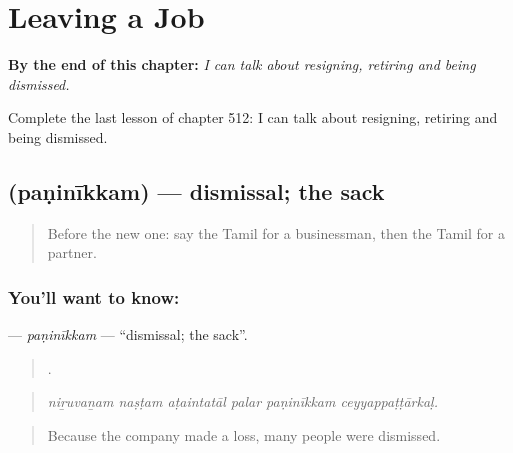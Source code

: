 
\chapter{Leaving a Job}
\label{ch:ta-leaving-a-job}

\begin{chapteropening}
\textbf{By the end of this chapter:} \emph{I can talk about resigning, retiring and being dismissed.}

Complete the last lesson of chapter 512: I can talk about resigning, retiring and being dismissed.
\end{chapteropening}

\section[\texorpdfstring{\ta{பணிநீக்கம்} (paṇinīkkam)}{பணிநீக்கம் (paṇinīkkam)}]{ (paṇinīkkam) — dismissal; the sack}

\label{lesson:TA-C512-paninikkam}



\begin{quote}
Before the new one: say the Tamil for a businessman, then the Tamil for a partner.
\end{quote}

\subsection*{You'll want to know: }
\textbf{} — \emph{paṇinīkkam} — \textquotedblleft{}dismissal; the sack\textquotedblright{}.

\begin{quote}
     .
\end{quote}

\begin{quote}
\emph{niṟuvaṉam naṣṭam aṭaintatāl palar paṇinīkkam ceyyappaṭṭārkaḷ.}
\end{quote}

\begin{quote}
Because the company made a loss, many people were dismissed.
\end{quote}

